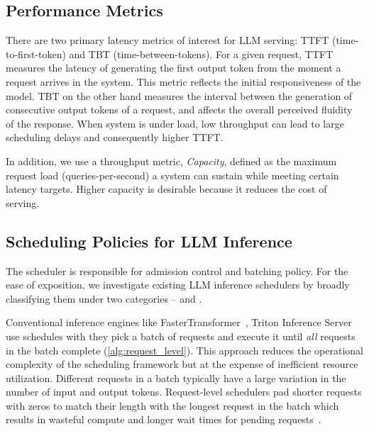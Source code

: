 \subsection{Performance Metrics}
\label{subsec:perf_metrics}
There are two primary latency metrics of interest for LLM serving: TTFT (time-to-first-token) and TBT (time-between-tokens). For a given request, TTFT measures the latency of generating the first output token from the moment a request arrives in the system. This metric reflects the initial responsiveness of the model. TBT on the other hand measures the interval between the generation of consecutive output tokens of a request, and affects the overall perceived fluidity of the response. When system is under load, low throughput can lead to large scheduling delays and consequently higher TTFT. 

In addition, we use a throughput metric, \textit{Capacity}, defined as the maximum request load (queries-per-second) a system can sustain while meeting certain latency targets. Higher capacity is desirable because it reduces the cost of serving. 








\subsection{Scheduling Policies for LLM Inference}
The scheduler is responsible for admission control and batching policy. For the ease of exposition, we investigate existing LLM inference schedulers by  broadly classifying them under two categories -- \prefillprio and \decodeprio.



Conventional inference engines like FasterTransformer~\cite{fastertransformer}, Triton Inference Server~\cite{triton-batch} use \decodeprio schedules with \rls \ie they pick a batch of requests and execute it until \textit{all} requests in the batch complete (\autoref{alg:request_level}). 
This approach reduces the operational complexity of the scheduling framework but at the expense of inefficient resource utilization. Different requests in a batch typically have a large variation in the number of input and output tokens. Request-level schedulers pad shorter requests with zeros to match their length with the longest request in the batch which results in wasteful compute and longer wait times for pending requests~\cite{orca}.



